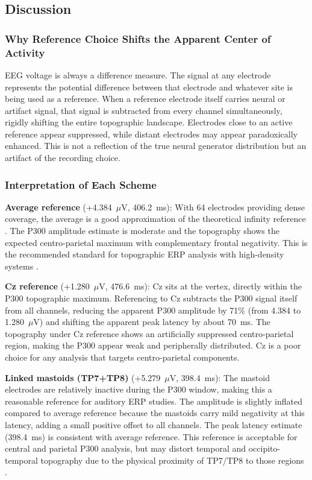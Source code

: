\documentclass[11pt, a4paper, twocolumn]{article}
\begin{document}
\subsection{Discussion}

\subsubsection{Why Reference Choice Shifts the Apparent Center of Activity}

EEG voltage is always a difference measure. The signal at any electrode
represents the potential difference between that electrode and whatever
site is being used as a reference. When a reference electrode itself
carries neural or artifact signal, that signal is subtracted from every
channel simultaneously, rigidly shifting the entire topographic landscape.
Electrodes close to an active reference appear suppressed, while distant
electrodes may appear paradoxically enhanced. This is not a reflection of
the true neural generator distribution but an artifact of the recording
choice.

\subsubsection{Interpretation of Each Scheme}

\textbf{Average reference} (+4.384~$\mu$V, 406.2~ms): With 64 electrodes
providing dense coverage, the average is a good approximation of the
theoretical infinity reference \citep{Yao2001}. The P300 amplitude
estimate is moderate and the topography shows the expected centro-parietal
maximum with complementary frontal negativity. This is the recommended
standard for topographic ERP analysis with high-density systems
\citep{Luck2005, NunezSrinivasan2006, Hagemann2001}.

\textbf{Cz reference} (+1.280~$\mu$V, 476.6~ms): Cz sits at the vertex,
directly within the P300 topographic maximum. Referencing to Cz subtracts
the P300 signal itself from all channels, reducing the apparent P300
amplitude by 71\% (from 4.384 to 1.280~$\mu$V) and shifting the apparent
peak latency by about 70~ms. The topography under Cz reference shows an
artificially suppressed centro-parietal region, making the P300 appear
weak and peripherally distributed. Cz is a poor choice for any analysis
that targets centro-parietal components.

\textbf{Linked mastoids (TP7+TP8)} (+5.279~$\mu$V, 398.4~ms): The mastoid
electrodes are relatively inactive during the P300 window, making this
a reasonable reference for auditory ERP studies. The amplitude is slightly
inflated compared to average reference because the mastoids carry mild
negativity at this latency, adding a small positive offset to all channels.
The peak latency estimate (398.4~ms) is consistent with average reference.
This reference is acceptable for central and parietal P300 analysis, but
may distort temporal and occipito-temporal topography due to the physical
proximity of TP7/TP8 to those regions \citep{Hagemann2001}.
\end{document}
